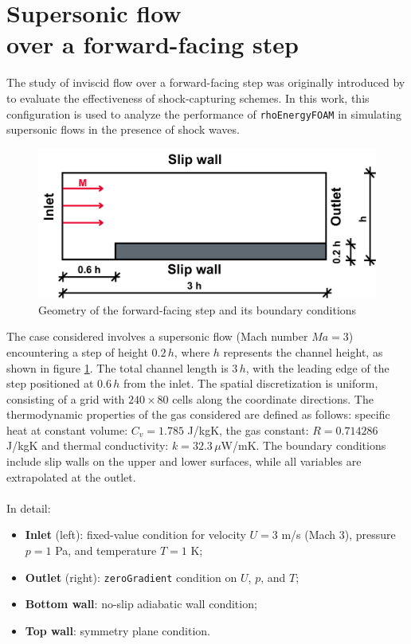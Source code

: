 \documentclass[a5paper]{sapthesis}
\begin{document}
	\section{Supersonic flow \\ over a forward-facing step}
	The study of inviscid flow over a forward-facing step was originally introduced by \citet{EMERY1968306} to evaluate the effectiveness of shock-capturing schemes. In this work, this configuration is used to analyze the performance of \texttt{rhoEnergyFOAM} in simulating supersonic flows in the presence of shock waves.
	
	\begin{figure}
		\centering
		\includegraphics[width=0.8 \linewidth]{Figures/FS_Geometry}
		\caption{Geometry of the forward-facing step and its boundary conditions}
		\label{FS_Geometry}
	\end{figure} 
	
	\noindent The case considered involves a supersonic flow (Mach number $Ma = 3$) encountering a step of height $0.2\,h$, where $h$ represents the channel height, as shown in figure \ref{FS_Geometry}. The total channel length is $3\,h$, with the leading edge of the step positioned at $0.6\,h$ from the inlet. The spatial discretization is uniform, consisting of a grid with $240 \times 80$ cells along the coordinate directions. 	The thermodynamic properties of the gas considered are defined as follows: specific heat at constant volume: $C_v = 1.785$ J/kgK, the gas constant: $R = 0.714286$ J/kgK and thermal conductivity: $k = 32.3 \,\mu$W/mK. The boundary conditions include slip walls on the upper and lower surfaces, while all variables are extrapolated at the outlet. \\
	\\
	In detail:
	
	\begin{itemize}
		\item \textbf{Inlet} (left): fixed-value condition for velocity $U = 3$ m/s (Mach 3), pressure $p = 1$ Pa, and temperature $T = 1$ K;
		\item \textbf{Outlet} (right): \texttt{zeroGradient} condition on $U$, $p$, and $T$;
		\item \textbf{Bottom wall}: no-slip adiabatic wall condition;
		\item \textbf{Top wall}: symmetry plane condition.
	\end{itemize}
\end{document}
